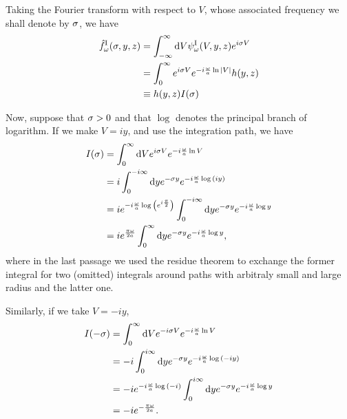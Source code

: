 Taking the Fourier transform with respect to \(V\), whose associated frequency we shall denote by \(\sigma\), we have
\begin{subequations}
    \begin{align}
        \hat{f}^{\text{I}}_\omega(\sigma,y,z)&=\int_{-\infty}^{\infty}\mathrm{d} V\psi^{\text{I}}_\omega(V,y,z)e^{i\sigma V}\\
        &=\int_0^\infty e^{i\sigma V}e^{-i\frac{\omega}{a}\ln{\lvert V\rvert}}h(y,z)\\
        &\equiv h(y,z)I(\sigma)
    \end{align}
\end{subequations}

Now, suppose that \(\sigma>0\) and that \(\log{}\) denotes the principal branch of logarithm. If we make \(V=iy\), and use the integration path, we have
\begin{subequations}
    \begin{align}
        I(\sigma)&=\int_0^\infty\mathrm{d} Ve^{i\sigma V}e^{-i\frac{\omega}{a}\ln{V}}\\
        &=i\int_0^{-i\infty}\mathrm{d} ye^{-\sigma y}e^{-i\frac{\omega}{a}\log{(iy)}}\\
        &=ie^{-i\frac{\omega}{a}\log{\left(e^{i\frac{\pi}{2}}\right)}}\int_0^{-i\infty}\mathrm{d} ye^{-\sigma y}e^{-i\frac{\omega}{a}\log{y}}\\
        &=ie^{\frac{\pi\omega}{2a}}\int_0^{\infty}\mathrm{d} ye^{-\sigma y}e^{-i\frac{\omega}{a}\log{y}},
    \end{align}
\end{subequations}
where in the last passage we used the residue theorem to exchange the former integral for two (omitted) integrals around paths with arbitraly small and large radius and the latter one.

Similarly, if we take \(V=-iy\),
\begin{subequations}
    \begin{align}
        I(-\sigma)&=\int_0^{\infty}\mathrm{d} Ve^{-i\sigma V}e^{-i\frac{\omega}{a}\ln{V}}\\
        &=-i\int_0^{i\infty}\mathrm{d} ye^{-\sigma y}e^{-i\frac{\omega}{a}\log{(-iy)}}\\
        &=-ie^{-i\frac{\omega}{a}\log{(-i)}}\int_0^{i\infty}\mathrm{d} ye^{-\sigma y}e^{-i\frac{\omega}{a}\log{y}}\\
        &=-ie^{-\frac{\pi\omega}{2a}}.
    \end{align}
\end{subequations}

